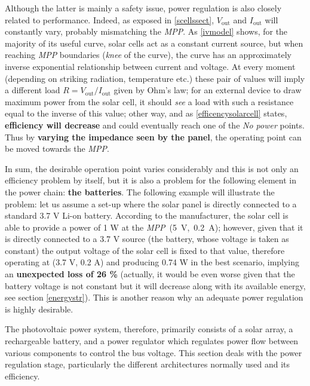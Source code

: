Although the latter is mainly a safety issue, power regulation is also closely related to performance. Indeed, as exposed in \ref{scellssect}, $V_{\text{out}}$ and $I_{\text{out}}$ will constantly vary, probably mismatching the \textit{MPP}. As \autoref{ivmodel} shows, for the majority of its useful curve, solar cells act as a constant current source, but when reaching \textit{MPP} boundaries (\textit{knee} of the curve), the curve has an approximately inverse exponential relationship between current and voltage. At every moment (depending on striking radiation, temperature etc.) these pair of values will imply a different load $R=V_{\text{out}}/I_{\text{out}}$ given by Ohm's law;  for an external device to draw maximum power from the solar cell, it	should \textit{see} a load with such a resistance equal to the inverse of this value; other way, and as \autoref{efficencysolarcell} states, \textbf{efficiency will decrease} and could eventually reach one of the \textit{No power} points. Thus by \textbf{varying the impedance seen by the panel}, the operating point can be moved towards the \textit{MPP}.

In sum, the desirable operation point varies considerably and this is not only an efficiency problem by itself, but it is also a problem for the following element in the power chain: \textbf{the batteries}. The following example will illustrate the problem: let us assume a set-up where the solar panel is directly connected to a standard 3.7 V Li-on battery. According to the manufacturer, the solar cell is able to provide a power of 1 W at the \textit{MPP}~(5~V,~0.2~A); however, given that it is directly connected to a 3.7 V source (the battery, whose voltage is taken as constant) the output voltage of the solar cell is fixed to that value, therefore operating at (3.7 V, 0.2 A) and producing 0.74 W in the best scenario, implying an \textbf{unexpected loss of 26 \%} (actually, it would be even worse given that the battery voltage is not constant but it will decrease along with its available energy, see section \ref{energystr}). This is another reason why an adequate power regulation is highly desirable.


The photovoltaic power system, therefore, primarily consists of a solar array, a rechargeable battery, and a power regulator which regulates power flow between various components to control the bus voltage. This section deals with the power regulation stage, particularly the different architectures normally used and its efficiency.



